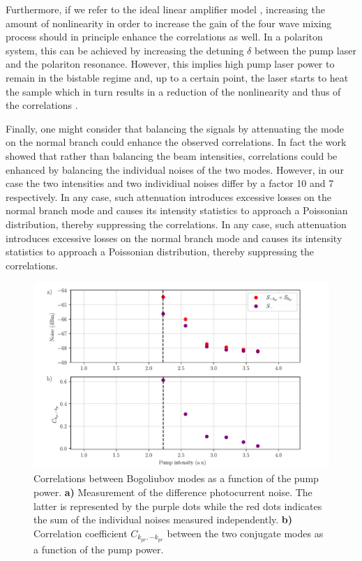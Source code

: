 Furthermore, if we refer 
to the ideal linear amplifier model \cite{boyd_nl_optics}, increasing the amount of nonlinearity in order to increase the gain of the four wave mixing process should in principle enhance the correlations as well. In a polariton
system, this can be achieved by increasing the detuning $\delta$ between the pump laser and the polariton resonance. However, this implies high pump laser power to remain in the bistable regime and, up to a certain point, the laser starts to heat the sample which in turn results in a reduction of the nonlinearity and thus of the correlations \cite{romanelli_4wm_2007}.


Finally, one might consider that balancing the signals by attenuating the mode on the normal branch could enhance the observed correlations.
 In fact the work \cite{Romanelli:04} showed that rather than balancing the beam intensities, correlations could 
be enhanced by balancing the individual noises of the two modes. However, in our case the two intensities and two individiual noises differ by a factor 10 and 7 respectively. In any case, such attenuation introduces excessive losses on the normal branch mode and causes its intensity statistics to approach a Poissonian distribution, thereby suppressing the correlations.
In any case, such attenuation introduces excessive losses on the normal branch mode and causes its intensity statistics to approach a Poissonian distribution, thereby suppressing the correlations.





\begin{figure}
    \centering
    \includegraphics[width=1\textwidth]{chap_correlation/fig/correlation_vs_bistab.pdf}
    \caption{Correlations between Bogoliubov modes as a function of the pump power. 
    \textbf{a)} Measurement of the difference photocurrent noise. The latter is represented by the purple dots while the red dots indicates the sum of the individual noises measured independently. \textbf{b)} Correlation coefficient $C_{k_{pr},-k_{pr}}$ between the two conjugate modes as a function of the pump power.}
    \label{fig:c_vs_bistab}
\end{figure}


